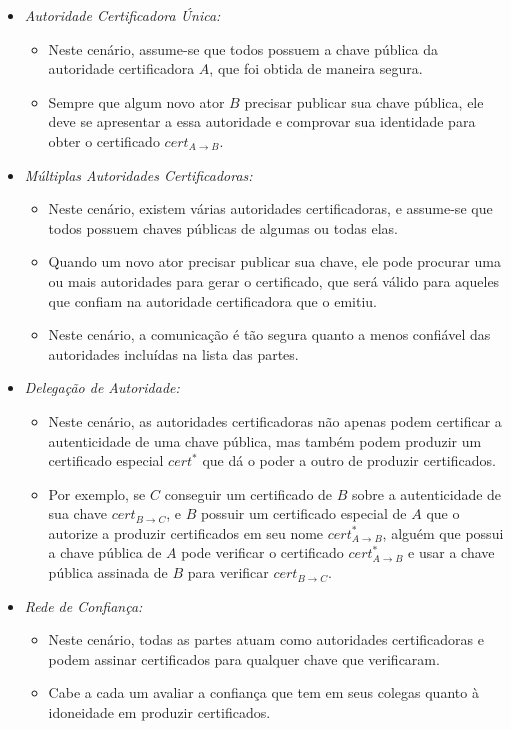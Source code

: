 \begin{itemize}
\item[] {\em Autoridade Certificadora Única:}
  \begin{itemize}
  \item Neste cenário, assume-se que todos possuem a chave pública da autoridade certificadora $A$, que foi obtida de maneira segura.
  \item Sempre que algum novo ator $B$ precisar publicar sua chave pública, ele deve se apresentar a essa autoridade e comprovar sua identidade para obter o certificado $cert_{A \to B}$.
  \end{itemize}
    
\item[] {\em Múltiplas Autoridades Certificadoras:}
  \begin{itemize}
  \item Neste cenário, existem várias autoridades certificadoras, e assume-se que todos possuem chaves públicas de algumas ou todas elas.
  \item Quando um novo ator precisar publicar sua chave, ele pode procurar uma ou mais autoridades para gerar o certificado, que será válido para aqueles que confiam na autoridade certificadora que o emitiu.
  \item Neste cenário, a comunicação é tão segura quanto a menos confiável das autoridades incluídas na lista das partes.
  \end{itemize}
    
\item[] {\em Delegação de Autoridade:}
  \begin{itemize}
  \item Neste cenário, as autoridades certificadoras não apenas podem certificar a autenticidade de uma chave pública, mas também podem produzir um certificado especial $cert^*$ que dá o poder a outro de produzir certificados.
  \item Por exemplo, se $C$ conseguir um certificado de $B$ sobre a autenticidade de sua chave $cert_{B \to C}$, e $B$ possuir um certificado especial de $A$ que o autorize a produzir certificados em seu nome $cert^*_{A \to B}$, alguém que possui a chave pública de $A$ pode verificar o certificado $cert^*_{A \to B}$ e usar a chave pública assinada de $B$ para verificar $cert_{B \to C}$.
  \end{itemize}
    
\item[] {\em Rede de Confiança:}
  \begin{itemize}
  \item Neste cenário, todas as partes atuam como autoridades certificadoras e podem assinar certificados para qualquer chave que verificaram.
  \item Cabe a cada um avaliar a confiança que tem em seus colegas quanto à idoneidade em produzir certificados.
  \end{itemize}
\end{itemize}

